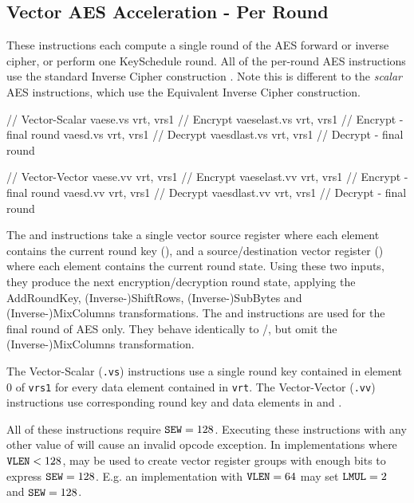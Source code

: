 
\subsection{Vector AES Acceleration - Per Round}
\label{sec:vector:aes:single-round}

These instructions each compute a single round of the AES forward
or inverse cipher, or perform one KeySchedule round.
All of the per-round AES instructions use the standard Inverse Cipher
construction \cite[Section 5.3]{nist:fips:197}.
Note this is different to the {\em scalar} AES instructions, which use
the Equivalent Inverse Cipher construction.

\begin{cryptoisa}
// Vector-Scalar
vaese.vs        vrt, vrs1        // Encrypt
vaeselast.vs    vrt, vrs1        // Encrypt - final round
vaesd.vs        vrt, vrs1        // Decrypt
vaesdlast.vs    vrt, vrs1        // Decrypt - final round

// Vector-Vector
vaese.vv        vrt, vrs1        // Encrypt
vaeselast.vv    vrt, vrs1        // Encrypt - final round
vaesd.vv        vrt, vrs1        // Decrypt
vaesdlast.vv    vrt, vrs1        // Decrypt - final round
\end{cryptoisa}

The  and  instructions take
a single vector source register where each element contains the
current round key (),
and
a source/destination vector register (\vrt) where each element contains
the current round state.
Using these two inputs, they produce the next encryption/decryption
round state, applying the 
AddRoundKey, (Inverse-)ShiftRows, (Inverse-)SubBytes and (Inverse-)MixColumns
transformations.
The  and  instructions
are used for the final round of AES only.
They behave identically to /, but
omit the (Inverse-)MixColumns transformation.

The Vector-Scalar ({\tt *.vs}) instructions use a single round key
contained in element $0$ of {\tt vrs1} for every data element
contained in {\tt vrt}.
The Vector-Vector ({\tt *.vv}) instructions use corresponding
round key and data elements in  and \vrt.

All of these instructions require ${\tt SEW}=128$.
Executing these instructions with any other value of \SEW will cause
an invalid opcode exception.
In implementations where ${\tt VLEN}<128$, \LMUL may be used to create
vector register groups with enough bits to express ${\tt SEW}=128$.
E.g. an implementation with ${\tt VLEN}=64$ may set ${\tt LMUL}=2$ and ${\tt SEW}=128$.

